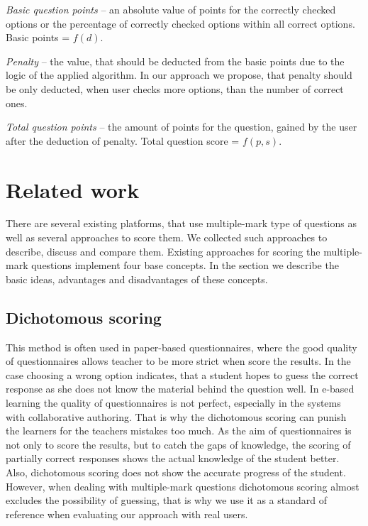 \textit{Basic question points} -- an absolute value of points for the correctly checked options or the percentage of correctly checked options within all correct options.
Basic points = $f(d)$.

\textit{Penalty} -- the value, that should be deducted from the basic points due to the logic of the applied algorithm.
		In our approach we propose, that penalty should be only deducted, when user checks more options, than the number of correct ones.

\textit{Total question points} -- the amount of points for the question, gained by the user after the deduction of penalty.
		Total question score = $f(p,s)$.

\section{Related work}
\label{sec:related}

There are several existing platforms, that use multiple-mark type of questions as well as several approaches to score them. 
We collected such approaches to describe, discuss and compare them.
Existing approaches for scoring the multiple-mark questions implement four base concepts.
In the section we describe the basic ideas, advantages and disadvantages of these concepts.

\subsection{Dichotomous scoring}

This method is often used in paper-based questionnaires, where the good quality of questionnaires allows teacher to be more strict when score the results.
In the case choosing a wrong option indicates, that a student hopes to guess the correct response as she does not know the material behind the question well.
In e-based learning the quality of questionnaires is not perfect, especially in the systems with collaborative authoring.
That is why the dichotomous scoring can punish the learners for the teachers mistakes too much. 
As the aim of questionnaires is not only to score the results, but to catch the gaps of knowledge, the scoring of partially correct responses shows the actual knowledge of the student better.
Also, dichotomous scoring does not show the accurate progress of the student.
However, when dealing with multiple-mark questions dichotomous scoring almost excludes the possibility of guessing, that is why we use it as a standard of reference when evaluating our approach with real users.

